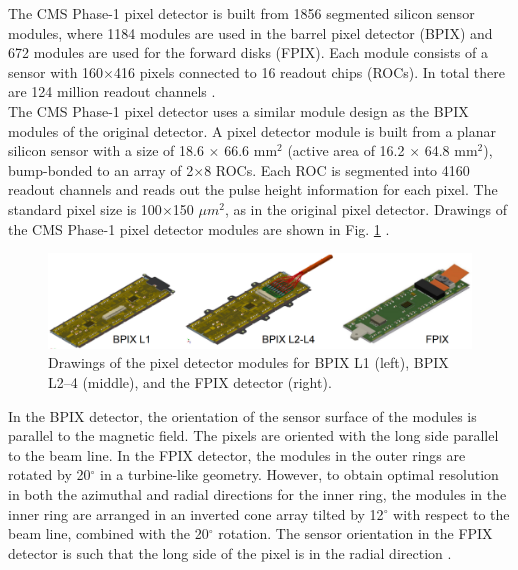 The CMS Phase-1 pixel detector is built from 1856 segmented silicon sensor modules, where 1184 modules are used in the barrel pixel detector (BPIX) and 672 modules are used for the forward disks (FPIX). Each module consists of a sensor with 160$\times$416 pixels connected to 16 readout chips (ROCs). In total there are 124 million readout channels \cite{phase1_Pixel_Detector}.\\
The CMS Phase-1 pixel detector uses a similar module design as the BPIX modules of the original detector. A pixel detector module is built from a planar silicon sensor with a size of 18.6 $\times$ 66.6 $\text{mm}^{2}$ (active area of 16.2 $\times$ 64.8 $\text{mm}^{2}$), bump-bonded to an array of 2$\times$8 ROCs. Each ROC is segmented into 4160 readout channels and reads out the pulse height information for each pixel. The standard pixel size is 100$\times$150 $\mu m^{2}$, as in the original pixel detector.%
Drawings of the CMS Phase-1 pixel detector modules are shown in Fig. \ref{modules_drawing} \cite{phase1_Pixel_Detector}.\\
\begin{center}
  \begin{figure}[ht]
    \centering
    \includegraphics[scale=.2]{Chapter2/modules_drawing.png}
    \caption[Pixel detector modules]{ Drawings of the pixel detector modules for BPIX L1 (left), BPIX L2–4 (middle), and the FPIX detector (right)\cite{phase1_Pixel_Detector}.}
    \label{modules_drawing}
  \end{figure}
\end{center}


In the BPIX detector, the orientation of the sensor surface of the modules is parallel to the magnetic field. The pixels are oriented with the long side parallel to the beam line. In the FPIX detector, the modules in the outer rings are rotated by 20$^{\circ}$ in a turbine-like geometry. However, to obtain optimal resolution in both the azimuthal and radial directions for the inner ring, the modules in the inner ring are arranged in an inverted cone array tilted by 12$^{\circ}$ with respect to the beam line, combined with the 20$^{\circ}$ rotation. The sensor orientation in the FPIX detector is such that the long side of the pixel is in the radial direction \cite{phase1_Pixel_Detector}.

